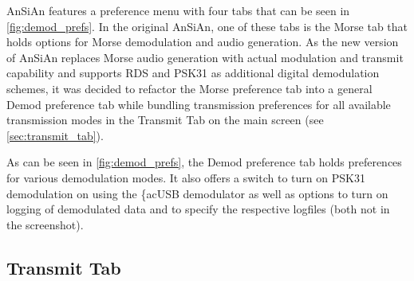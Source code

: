 \ac{AnSiAn} features a preference menu with four tabs that can be seen in \autoref{fig:demod_prefs}. In the original \ac{AnSiAn}, one of these tabs is the Morse tab that holds options for Morse demodulation and audio generation. As the new version of \ac{AnSiAn} replaces Morse audio generation with actual modulation and transmit capability and supports \ac{RDS} and \ac{PSK31} as additional digital demodulation schemes, it was decided to refactor the Morse preference tab into a general Demod preference tab while bundling transmission preferences for all available transmission modes in the Transmit Tab on the main screen (see \autoref{sec:transmit_tab}).

As can be seen in \autoref{fig:demod_prefs}, the Demod preference tab holds preferences for various demodulation modes. It also offers a switch to turn on \ac{PSK31} demodulation on using the \{ac{USB} demodulator as well as options to turn on logging of demodulated data and to specify the respective logfiles (both not in the screenshot). 

\subsection{Transmit Tab\label{sec:transmit_tab}}

